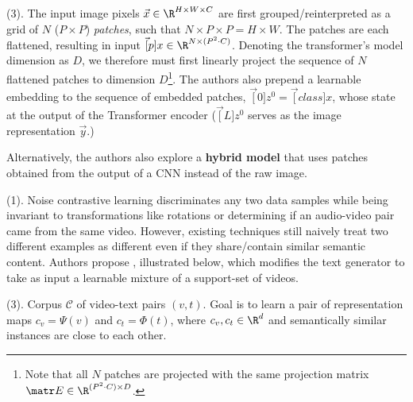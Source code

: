 \documentclass[11pt]{article}
\begin{document}

 (3). The input image pixels $\vec x \in \R^{H \times W \times C}$ are first grouped/reinterpreted as a grid of $N$ ($P \times P$) \textit{patches}, such that $N \times P \times P = H \times W$. The patches are each flattened, resulting in input $\vec[p]{x} \in \R^{N \times (P^2 \cdot C)}$. Denoting the transformer's model dimension as $D$, we therefore must first linearly project the sequence of $N$ flattened patches to dimension $D$\footnote{Note that all $N$ patches are projected with the same projection matrix $\matr E \in \R^{(P^2 \cdot C) \times D}$.}. The authors also prepend a learnable embedding to the sequence of embedded patches, $\vec[0]{z}^0 = \vec[class]{x}$, whose state at the output of the Transformer encoder ($\vec[L]{z}^0$ serves as the image representation $\vec y$.) \\


Alternatively, the authors also explore a \textbf{hybrid model} that uses patches obtained from the output of a CNN instead of the raw image. 






 (1). Noise contrastive learning discriminates any two data samples while being invariant to transformations like rotations or determining if an audio-video pair came from the same video. However, existing techniques still naively treat two different examples as different even if they share/contain similar semantic content. Authors propose , illustrated below, which modifies the text generator to take as input a learnable mixture of a support-set of videos. 


 (3). Corpus $\mathcal C$ of video-text pairs $(v, t)$. Goal is to learn a pair of representation maps $c_v = \Psi(v)$ and $c_t = \Phi(t)$, where $c_v, c_t \in \R^d$ and semantically similar instances are close to each other. 
\end{document}
